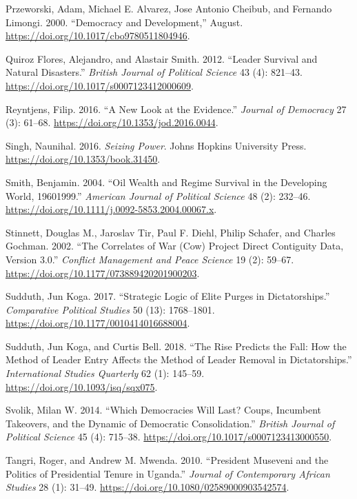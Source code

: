 \documentclass[
  12pt,
]{report}
\newlength{\cslhangindent}
\newenvironment{CSLReferences}[2] %
 {\begin{list}{}{%
  \setlength{\itemindent}{0pt}
  \setlength{\leftmargin}{0pt}
  \setlength{\parsep}{0pt}
  \ifodd #1
   \setlength{\leftmargin}{\cslhangindent}
   \setlength{\itemindent}{-1\cslhangindent}
  \fi
  \setlength{\itemsep}{#2\baselineskip}}}
 {\end{list}}
\begin{document}
\begin{CSLReferences}{1}{0}
Przeworski, Adam, Michael E. Alvarez, Jose Antonio Cheibub, and Fernando
Limongi. 2000. {``Democracy and Development,''} August.
\url{https://doi.org/10.1017/cbo9780511804946}.

Quiroz Flores, Alejandro, and Alastair Smith. 2012. {``Leader Survival
and Natural Disasters.''} \emph{British Journal of Political Science} 43
(4): 821--43. \url{https://doi.org/10.1017/s0007123412000609}.

Reyntjens, Filip. 2016. {``A New Look at the Evidence.''} \emph{Journal
of Democracy} 27 (3): 61--68.
\url{https://doi.org/10.1353/jod.2016.0044}.

Singh, Naunihal. 2016. \emph{Seizing Power}. Johns Hopkins University
Press. \url{https://doi.org/10.1353/book.31450}.

Smith, Benjamin. 2004. {``Oil Wealth and Regime Survival in the
Developing World, 1960{\textendash}1999.''} \emph{American Journal of
Political Science} 48 (2): 232--46.
\url{https://doi.org/10.1111/j.0092-5853.2004.00067.x}.

Stinnett, Douglas M., Jaroslav Tir, Paul F. Diehl, Philip Schafer, and
Charles Gochman. 2002. {``The Correlates of War (Cow) Project Direct
Contiguity Data, Version 3.0.''} \emph{Conflict Management and Peace
Science} 19 (2): 59--67.
\url{https://doi.org/10.1177/073889420201900203}.

Sudduth, Jun Koga. 2017. {``Strategic Logic of Elite Purges in
Dictatorships.''} \emph{Comparative Political Studies} 50 (13):
1768--1801. \url{https://doi.org/10.1177/0010414016688004}.

Sudduth, Jun Koga, and Curtis Bell. 2018. {``The Rise Predicts the Fall:
How the Method of Leader Entry Affects the Method of Leader Removal in
Dictatorships.''} \emph{International Studies Quarterly} 62 (1):
145--59. \url{https://doi.org/10.1093/isq/sqx075}.

Svolik, Milan W. 2014. {``Which Democracies Will Last? Coups, Incumbent
Takeovers, and the Dynamic of Democratic Consolidation.''} \emph{British
Journal of Political Science} 45 (4): 715--38.
\url{https://doi.org/10.1017/s0007123413000550}.

Tangri, Roger, and Andrew M. Mwenda. 2010. {``President Museveni and the
Politics of Presidential Tenure in Uganda.''} \emph{Journal of
Contemporary African Studies} 28 (1): 31--49.
\url{https://doi.org/10.1080/02589000903542574}.


\end{CSLReferences}
\end{document}
